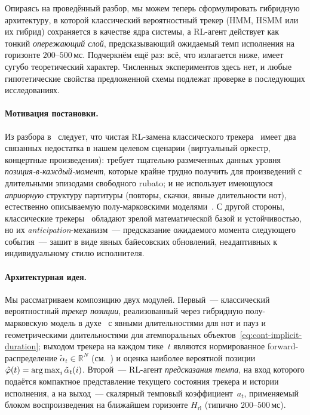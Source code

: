 %
Опираясь на проведённый разбор, мы можем теперь сформулировать
гибридную архитектуру, в которой классический вероятностный
трекер (HMM, HSMM или их гибрид) сохраняется в качестве ядра
системы, а RL-агент действует как тонкий \textit{опережающий
слой}, предсказывающий ожидаемый темп исполнения на горизонте
$200$--$500$\,мс. Подчеркнём ещё раз: всё, что излагается ниже,
имеет сугубо теоретический характер. Численных экспериментов
здесь нет, и любые гипотетические свойства предложенной схемы
подлежат проверке в последующих исследованиях.

\paragraph*{Мотивация постановки.} Из разбора в~
следует, что чистая RL-замена классического
трекера~\cite{Dorfer2018RL} имеет два связанных недостатка
в нашем целевом сценарии (виртуальный оркестр, концертные
произведения): требует тщательно размеченных данных уровня
\textit{позиция-в-каждый-момент}, которые крайне трудно
получить для произведений с длительными эпизодами свободного
rubato; и не использует имеющуюся \textit{априорную} структуру
партитуры (повторы, скачки, явные длительности нот),
естественно описываемую полу-марковскими
моделями~\cite{Cont2010,Nakamura2015}. С другой стороны,
классические трекеры~\cite{Cont2010,Raphael2010,Nakamura2015}
обладают зрелой математической базой и устойчивостью, но их
\textit{anticipation}-механизм~--- предсказание ожидаемого
момента следующего события~--- зашит в виде явных байесовских
обновлений, неадаптивных к индивидуальному стилю исполнителя.

\paragraph*{Архитектурная идея.} Мы рассматриваем композицию
двух модулей. Первый~--- классический вероятностный
\textit{трекер позиции}, реализованный через гибридную
полу-марковскую модель в духе~\cite{Cont2010} с явными
длительностями для нот и пауз и геометрическими длительностями
для атемпоральных объектов~\eqref{eq:cont-implicit-duration};
выходом трекера на каждом тике~$t$ являются нормированное
forward-распределение $\tilde\alpha_t \in \mathbb{R}^N$ (см.\
) и оценка наиболее вероятной позиции
$\hat\varphi(t) = \operatorname*{arg\,max}_i \tilde\alpha_t(i)$. Второй~---
RL-агент \textit{предсказания темпа}, на вход которого
подаётся компактное представление текущего состояния трекера и
истории исполнения, а на выход~--- скалярный темповый
коэффициент~$a_t$, применяемый блоком воспроизведения на
ближайшем горизонте $H_{\text{rl}}$ (типично
$200$--$500$\,мс).


